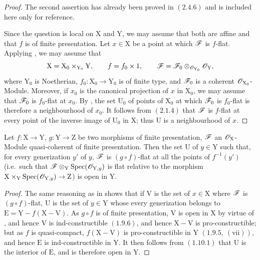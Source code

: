 \begin{proof}
The second assertion has already been proved in $(2.4.6)$ and is
included here only for reference.

Since the question is local on $\mathrm{X}$ and $\mathrm{Y}$, we may
assume that both are affine and that $f$ is of finite presentation. Let
$x\in\mathrm{X}$ be a point at which $\mathscr{F}$ is $f$-flat. Applying
, we may assume that
\[
  \mathrm{X}=\mathrm{X}_0\times_{\mathrm{Y}_0}\mathrm{Y},
  \qquad
  f=f_0\times 1,
  \qquad
  \mathscr{F}
  =\mathscr{F}_0\otimes_{\mathscr{O}_{\mathrm{Y}_0}}\mathscr{O}_\mathrm{Y},
\]
where $\mathrm{Y}_0$ is Noetherian,
$f_0:\mathrm{X}_0\to\mathrm{Y}_0$ is of finite type, and
$\mathscr{F}_0$ is a coherent $\mathscr{O}_{\mathrm{X}_0}$-Module. Moreover, if
$x_0$ is the canonical projection of $x$ in $\mathrm{X}_0$, we may
assume that $\mathscr{F}_0$ is $f_0$-flat at $x_0$. By
, the set $\mathrm{U}_0$ of points of
$\mathrm{X}_0$ at which $\mathscr{F}_0$ is $f_0$-flat is therefore a
neighbourhood of $x_0$. It follows from $(2.1.4)$ that $\mathscr{F}$ is
$f$-flat at every point of the inverse image of $\mathrm{U}_0$ in
$\mathrm{X}$; thus $\mathrm{U}$ is a neighbourhood of $x$.
\end{proof}


\begin{corollary}[11.3.2]
\label{IV.11.3.2}
Let $f:\mathrm{X}\to\mathrm{Y}$, $g:\mathrm{Y}\to\mathrm{Z}$ be two morphisms of finite presentation, $\mathscr{F}$ an $\mathscr{O}_\mathrm{X}$-Module quasi-coherent of finite presentation. Then the set $\mathrm{U}$ of $y\in\mathrm{Y}$ such that, for every generization $y'$ of $y$, $\mathscr{F}$ is $(g\circ f)$-flat at all the points of $f^{-1}(y')$ (i.e.\ such that $\mathscr{F}\otimes_\mathrm{Y}\operatorname{Spec}(\mathscr{O}_{\mathrm{Y},y})$ is flat relative to the morphism $\mathrm{X}\times_\mathrm{Y}\operatorname{Spec}(\mathscr{O}_{\mathrm{Y},y})\to\mathrm{Z}$) is open in $\mathrm{Y}$.
\end{corollary}

\begin{proof}
The same reasoning as in  shows that if $\mathrm{V}$ is the set of $x\in\mathrm{X}$ where $\mathscr{F}$ is $(g\circ f)$-flat, $\mathrm{U}$ is the set of $y\in\mathrm{Y}$ whose every generization belongs to $\mathrm{E}=\mathrm{Y}-f(\mathrm{X}-\mathrm{V})$. As $g\circ f$ is of finite presentation, $\mathrm{V}$ is open in $\mathrm{X}$ by virtue of , and hence $\mathrm{V}$ is ind-constructible $(1.9.6)$, and hence $\mathrm{X}-\mathrm{V}$ is pro-constructible; but as $f$ is quasi-compact, $f(\mathrm{X}-\mathrm{V})$ is pro-constructible in $\mathrm{Y}$ $(1.9.5,~(\mathrm{vii}))$, and hence $\mathrm{E}$ is ind-constructible in $\mathrm{Y}$. It then follows from $(1.10.1)$ that $\mathrm{U}$ is the interior of $\mathrm{E}$, and is therefore open in $\mathrm{Y}$.
\end{proof}

